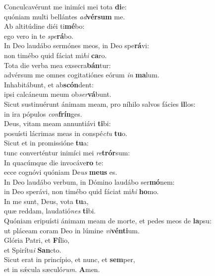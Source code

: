 \evenverse Conculcavérunt me inimíci mei tota \textbf{di}e:~\*\\
\evenverse quóniam multi bellántes \textit{ad}\textbf{vér}\textbf{sum} me.\\
\oddverse Ab altitúdine diéi ti\textbf{mé}bo:~\*\\
\oddverse ego vero in te \textit{spe}\textbf{rá}bo.\\
\evenverse In Deo laudábo sermónes meos, in Deo spe\textbf{rá}vi:~\*\\
\evenverse non timébo quid fáciat mi\textit{hi} \textbf{ca}ro.\\
\oddverse Tota die verba mea exsecra\textbf{bán}tur:~\*\\
\oddverse advérsum me omnes cogitatiónes eórum \textit{in} \textbf{ma}lum.\\
\evenverse Inhabitábunt, et ab\textbf{scón}dent:~\*\\
\evenverse ipsi calcáneum meum ob\textit{ser}\textbf{vá}bunt.\\
\oddverse Sicut sustinuérunt ánimam meam, pro níhilo salvos fácies \textbf{il}los:~\*\\
\oddverse in ira pópulos \textit{con}\textbf{frín}ges.\\
\evenverse Deus, vitam meam annuntiávi \textbf{ti}bi:~\*\\
\evenverse posuísti lácrimas meas in conspé\textit{ctu} \textbf{tu}o.\\
\oddverse Sicut et in promissióne \textbf{tu}a:~\*\\
\oddverse tunc converténtur inimíci mei \textit{re}\textbf{trór}sum:\\
\evenverse In quacúmque die invocáve\textbf{ro} te:~\*\\
\evenverse ecce cognóvi quóniam De\textit{us} \textbf{me}\textbf{us} es.\\
\oddverse In Deo laudábo verbum, in Dómino laudábo ser\textbf{mó}nem:~\*\\
\oddverse in Deo sperávi, non timébo quid fáciat mi\textit{hi} \textbf{ho}mo.\\
\evenverse In me sunt, Deus, vota \textbf{tu}a,~\*\\
\evenverse quæ reddam, laudatió\textit{nes} \textbf{ti}bi.\\
\oddverse Quóniam eripuísti ánimam meam de morte, et pedes meos de \textbf{la}psu:~\*\\
\oddverse ut pláceam coram Deo in lúmine \textit{vi}\textbf{vén}\textbf{ti}um.\\
\evenverse Glória Patri, et \textbf{Fí}lio,~\*\\
\evenverse et Spirítu\textit{i} \textbf{San}cto.\\
\oddverse Sicut erat in princípio, et nunc, et \textbf{sem}per,~\*\\
\oddverse et in sǽcula sæculó\textit{rum}. \textbf{A}men.\\
